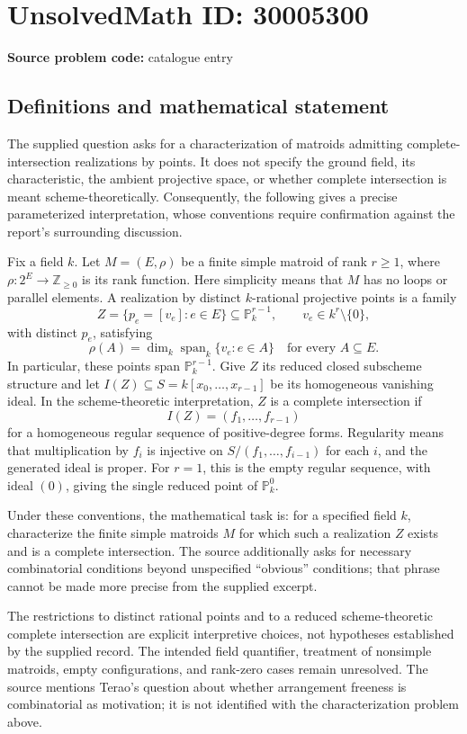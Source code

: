 \documentclass[11pt]{article}
\newcommand{\Z}{\mathbb{Z}}
\newcommand{\PP}{\mathbb{P}}
\begin{document}
\section*{UnsolvedMath ID: 30005300}
\textbf{Source problem code:} catalogue entry
\subsection{Definitions and mathematical statement}
The supplied question asks for a characterization of matroids admitting complete-intersection realizations by points. It does not specify the ground field, its characteristic, the ambient projective space, or whether complete intersection is meant scheme-theoretically. Consequently, the following gives a precise parameterized interpretation, whose conventions require confirmation against the report's surrounding discussion.

Fix a field \(k\). Let \(M=(E,\rho)\) be a finite simple matroid of rank \(r\geq 1\), where \(\rho:2^E\to\Z_{\geq 0}\) is its rank function. Here simplicity means that \(M\) has no loops or parallel elements. A realization by distinct \(k\)-rational projective points is a family
\[
Z=\{p_e=[v_e]:e\in E\}\subseteq\PP^{r-1}_k,
\qquad v_e\in k^r\setminus\{0\},
\]
with distinct \(p_e\), satisfying
\[
\rho(A)=\dim_k\operatorname{span}_k\{v_e:e\in A\}
\quad\text{for every }A\subseteq E.
\]
In particular, these points span \(\PP^{r-1}_k\). Give \(Z\) its reduced closed subscheme structure and let \(I(Z)\subseteq S=k[x_0,\ldots,x_{r-1}]\) be its homogeneous vanishing ideal. In the scheme-theoretic interpretation, \(Z\) is a complete intersection if
\[
I(Z)=(f_1,\ldots,f_{r-1})
\]
for a homogeneous regular sequence of positive-degree forms. Regularity means that multiplication by \(f_i\) is injective on \(S/(f_1,\ldots,f_{i-1})\) for each \(i\), and the generated ideal is proper. For \(r=1\), this is the empty regular sequence, with ideal \((0)\), giving the single reduced point of \(\PP^0_k\).

Under these conventions, the mathematical task is: for a specified field \(k\), characterize the finite simple matroids \(M\) for which such a realization \(Z\) exists and is a complete intersection. The source additionally asks for necessary combinatorial conditions beyond unspecified ``obvious'' conditions; that phrase cannot be made more precise from the supplied excerpt.

The restrictions to distinct rational points and to a reduced scheme-theoretic complete intersection are explicit interpretive choices, not hypotheses established by the supplied record. The intended field quantifier, treatment of nonsimple matroids, empty configurations, and rank-zero cases remain unresolved. The source mentions Terao's question about whether arrangement freeness is combinatorial as motivation; it is not identified with the characterization problem above.
\end{document}

